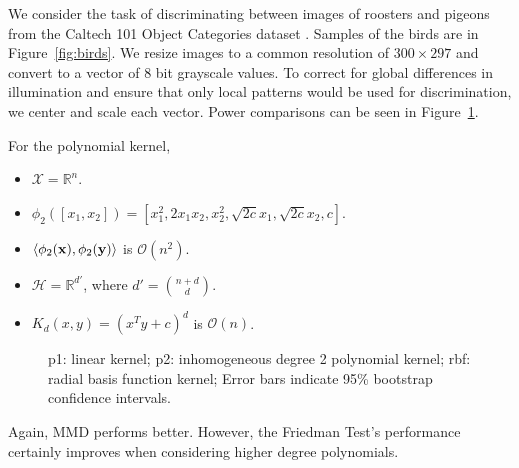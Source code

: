 We consider the task of discriminating between images of roosters and
pigeons from the Caltech 101 Object Categories dataset
\cite{fei2007learning}.  Samples of the birds are in Figure~\ref{fig:birds}.
We resize images to a common resolution of $300 \times
297$ and convert to a vector of 8 bit grayscale values.
To correct for global differences in illumination and ensure
that only local patterns would be used for discrimination, we center and
scale each vector.  Power comparisons can be seen in Figure~\ref{fig:power_birds}.

For the polynomial kernel,
\begin{itemize}
\item $\mathcal{X} = \mathbb{R}^{n}$.
\item $\phi_2 ([x_1, x_2]) = [x_1^2,  2x_1x_2,  x_2^2, \sqrt{2c}x_1, \sqrt{2c}x_2, c]$.
\item $\langle \phi_2({\bf x}), \phi_2({\bf y}) \rangle$ is $\mathcal{O}(n^2)$.
\item $\mathcal{H} = \mathbb{R}^{d'}$, where $d' = \binom{n+d}{d}$.
\item $K_d(x,y) = (x^T y  + c)^d$ is $\mathcal{O}(n)$.
\end{itemize}

\begin{figure}
  \begin{center}
    \resizebox{14.0cm}{!}{
      
    }
  \end{center}
  \caption{p1: linear kernel; p2: inhomogeneous degree 2 polynomial
    kernel; rbf: radial basis function kernel; Error bars indicate
    95\% bootstrap confidence intervals.}
  \label{fig:power_birds}
\end{figure}

Again, MMD performs better.  However, the Friedman Test's performance
certainly improves when considering higher degree polynomials.


